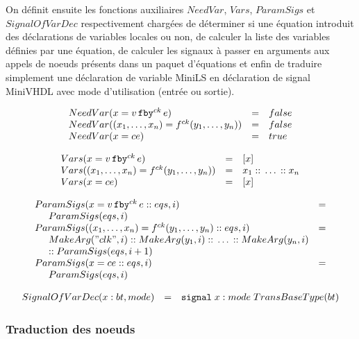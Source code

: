 \documentclass[a4paper]{article}
\newcommand{\minils}{{\sc MiniLS}}
\newcommand{\minivhdl}{{\sc MiniVHDL}}
\newcommand{\mybox}[1]{\mbox{\tt{#1}}}
\newcommand{\ind}[0]{\hspace{0.5cm}}
\newcommand{\Cons}[0]{\; \mathbf{::} \;}
\newcommand{\Fby}[2]{#1 \, \mybox{fby}^{ck} \, #2}
\newcommand{\App}[2]{#1^{ck}(#2)}
\begin{document}
On d\'efinit ensuite les fonctions auxiliaires $NeedVar$, $Vars$,
$ParamSigs$ et $SignalOfVarDec$ respectivement charg\'ees de d\'eterminer
si une \'equation introduit des d\'eclarations de variables locales ou
non, de calculer la liste des variables d\'efinies par une \'equation, de
calculer les signaux \`a passer en arguments aux appels de noeuds
pr\'esents dans un paquet d'\'equations et enfin de traduire simplement
une d\'eclaration de variable \minils{} en d\'eclaration de signal
\minivhdl{} avec mode d'utilisation (entr\'ee ou sortie).

\newcommand{\NV}[1]{NeedVar(#1)}
\newcommand{\V}[1]{Vars(#1)}
\newcommand{\PS}[2]{ParamSigs(#1,#2)}
\newcommand{\SoVD}[3]{SignalOfVarDec(#1 : #2, #3)}

\[
\begin{array}{lcl}
  \NV{x = \Fby{v}{e}} & = & false \\
  \NV{(x_1,\dots,x_n) = \App{f}{y_1,\dots,y_n}} & = & false \\
  \NV{x = ce} & = & true
\end{array}
\]

\[
\begin{array}{lcl}
  \V{x = \Fby{v}{e}} & = & [x] \\
  \V{(x_1,\dots,x_n) = \App{f}{y_1,\dots,y_n}} & = & x_1 \Cons \dots \Cons x_n \\
  \V{x = ce} & = & [x]
\end{array}
\]

\[
\begin{array}{ll}
  \PS{x = \Fby{v}{e} \Cons eqs}{i} & = \\
  \ind \PS{eqs}{i} \\
  \PS{(x_1,\dots,x_n) = \App{f}{y_1,\dots,y_n} \Cons eqs}{i} & = \\
  \ind \MA{"clk"}{i} \Cons \MA{y_1}{i} \Cons \dots \Cons \MA{y_n}{i} \\
  \ind \mathtt{::} \; \PS{eqs}{i + 1}
  \\
  \PS{x = ce \Cons eqs}{i} & = \\
  \ind \PS{eqs}{i}
\end{array}
\]

\[
\begin{array}[lcl]{lcl}
  \SoVD{x}{bt}{mode} & = & \mybox{signal} \; x : mode \; TransBaseType(bt)
\end{array}
\]

\subsubsection{Traduction des noeuds}
\end{document}
